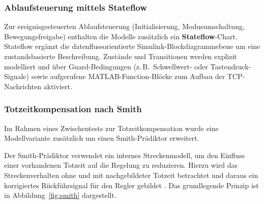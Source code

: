 \subsubsection{Ablaufsteuerung mittels Stateflow}

Zur ereignisgesteuerten Ablaufsteuerung (Initialisierung, Modusumschaltung,
Bewegungsfreigabe) enthalten die Modelle zusätzlich ein
\textbf{Stateflow}-Chart. Stateflow ergänzt die datenflussorientierte
Simulink-Blockdiagrammebene um eine zustandsbasierte Beschreibung. 
Zustände
und Transitionen werden explizit modelliert und über Guard-Bedingungen
(z.\,B.\ Schwellwert- oder Tastendruck-Signale) sowie aufgerufene
MATLAB-Function-Blöcke zum Aufbau der TCP-Nachrichten aktiviert.

\subsubsection{Totzeitkompensation nach Smith}
\label{sec:smith}

Im Rahmen eines Zwischentests zur Totzeitkompensation wurde eine
Modellvariante zusätzlich um einen Smith-Prädiktor erweitert.

Der Smith-Prädiktor verwendet ein internes Streckenmodell, um den Einfluss
einer vorhandenen Totzeit auf die Regelung zu reduzieren. Hierzu wird das
Streckenverhalten ohne und mit nachgebildeter Totzeit betrachtet und daraus
ein korrigiertes Rückführsignal für den Regler gebildet
\cite{NormeyRico2022}. Das grundlegende Prinzip ist in
Abbildung~\ref{fig:smith} dargestellt.


